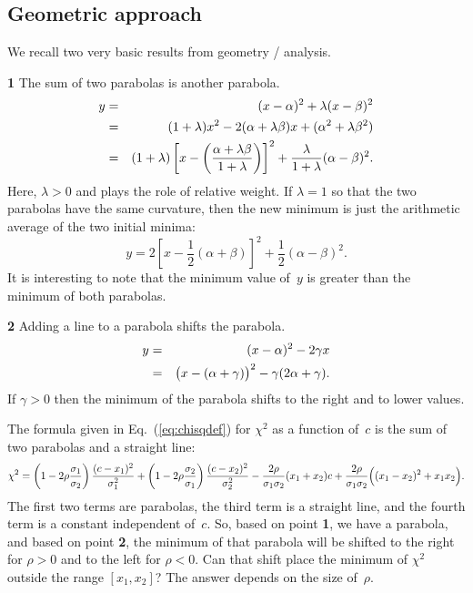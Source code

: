 \documentclass[11pt]{article}
\newcommand{\xa}   {x_1}
\newcommand{\xb}   {x_2}
\newcommand{\ua} {\sigma_{1}}
\newcommand{\ub} {\sigma_{2}}
\newcommand{\uaq} {\sigma^2_{1}}
\newcommand{\ubq} {\sigma^2_{2}}
\begin{document}
\subsection{Geometric approach}
\par
We recall two very basic results from geometry / analysis.
\par\noindent
{\bf{1}}
The sum of two parabolas is another parabola.
\begin{eqnarray*}
 y &=& (x-\alpha)^2 + \lambda (x-\beta)^2 \cr
    &=& (1+\lambda) x^2 - 2 ( \alpha + \lambda\beta ) x + (\alpha^2 + \lambda\beta^2) \cr
    &=& (1+\lambda) \left[ x - \left(\frac{\alpha+\lambda\beta}{1+\lambda}\right) \right]^2
    + \frac{\lambda}{1+\lambda} (\alpha - \beta)^2 .
\end{eqnarray*}
Here, $\lambda > 0$ and plays the role of relative weight.  If $\lambda = 1$ so that
the two parabolas have the same curvature, then the new minimum is just the
arithmetic average of the two initial minima:
$$
  y = 2 \left[ x - \frac{1}{2}(\alpha+\beta) \right]^2 + \frac{1}{2} (\alpha - \beta)^2 .
$$
It is interesting to note that the minimum value of~$y$ is greater than the minimum
of both parabolas.
\par\noindent
{\bf{2}}
Adding a line to a parabola shifts the parabola.
\begin{eqnarray*}
 y &=& (x-\alpha)^2 - 2\gamma x \cr
    &=& \bigl( x - (\alpha+\gamma) \bigr)^2 - \gamma (2\alpha + \gamma) .
\end{eqnarray*}
If $\gamma > 0$ then the minimum of the parabola shifts to the right and to lower values.
\par
The formula given in Eq.~(\ref{eq:chisqdef}) for $\chi^2$ as a function of~$c$  
is the sum of two parabolas and a straight line:
$$
  \chi^2 = \left(1 - 2\rho\frac{\ua}{\ub} \right) \frac{(c-\xa)^2}{\uaq} 
         + \left(1 - 2\rho\frac{\ub}{\ua} \right) \frac{(c-\xb)^2}{\ubq} 
              - \frac{2\rho}{\ua\ub} (\xa+\xb) c
              + \frac{2\rho}{\ua\ub} \Bigl( (\xa-\xb)^2 + \xa\xb \Bigr) .
$$
The first two terms are parabolas, the third term is a straight line,
and the fourth term is a constant independent of~$c$.
So, based on point {\bf{1}}, we have a parabola,
and based on point {\bf{2}}, the minimum of that parabola will
be shifted to the right for $\rho > 0$ and to the left for $\rho < 0$.
Can that shift place the minimum of $\chi^2$ outside the range $[ \xa, \xb]$?
The answer depends on the size of~$\rho$.
\end{document}
